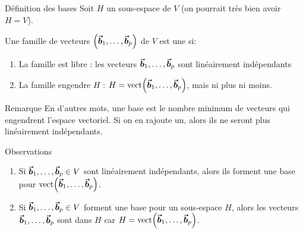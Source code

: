 \documentclass[a4paper]{article}
\begin{document}
\begin{parag}{Définition des bases}
    Soit $H$ un sous-espace de $V$ (on pourrait très bien avoir $H = V$).


    Une famille de vecteurs $\left(\bvec{b}_1, \ldots, \bvec{b}_p\right)$ de $V$ est une  si:
    \begin{enumerate}
        \item La famille est libre : les vecteurs $\bm{\protect\vec{b}}_1, \ldots, \bm{\protect\vec{b}}_p$ sont linéairement indépendants
        \item La famille engendre $H$ : $H = \vect\left(\bvec{b}_1, \ldots, \bvec{b}_p\right)$, mais ni plus ni moins.
    \end{enumerate}

    \begin{subparag}{Remarque}
       En d'autres mots, une base est le nombre minimum de vecteurs qui engendrent l'espace vectoriel. Si on en rajoute un, alors ils ne seront plus linéairement indépendants.
    \end{subparag}
\end{parag}

\begin{parag}{Observations}
    \begin{enumerate}[left=0pt]
        \item Si $\bm{\protect\vec{b}}_1, \ldots, \bm{\protect\vec{b}}_p \in V$ sont linéairement indépendants, alors ils forment une base pour $\vect\left(\bvec{b}_1, \ldots, \bvec{b}_p\right)$.
        \item Si $\bm{\protect\vec{b}}_1, \ldots, \bm{\protect\vec{b}}_p \in V$ forment une base pour un sous-espace $H$, alors les vecteurs $\bm{\protect\vec{b}}_1, \ldots, \bm{\protect\vec{b}}_p$ sont dans $H$ car $H = \vect\left(\bvec{b}_1, \ldots, \bvec{b}_p\right)$.
    \end{enumerate}

\end{parag}
\end{document}
